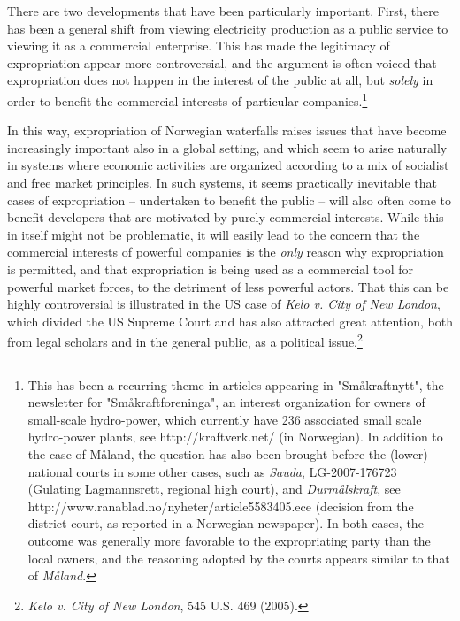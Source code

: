 There are two developments that have been particularly important. First, there has been a general shift from viewing electricity production as a public service to viewing it as a commercial enterprise. This has made the legitimacy of expropriation appear more controversial, and the argument is often voiced that expropriation does not happen in the interest of the public at all, but \emph{solely} in order to benefit the commercial interests of particular companies.\footnote{This has been a recurring theme in articles appearing in "Småkraftnytt", the newsletter for "Småkraftforeninga", an interest organization for owners of small-scale hydro-power, which currently have 236 associated small scale hydro-power plants, see http://kraftverk.net/ (in Norwegian). In addition to the case of Måland, the question has also been brought before the (lower) national courts in some other cases, such as \emph{Sauda}, LG-2007-176723 (Gulating Lagmannsrett, regional high court), and \emph{Durmålskraft}, see http://www.ranablad.no/nyheter/article5583405.ece (decision from the district court, as reported in a Norwegian newspaper). In both cases, the outcome was generally more favorable to the expropriating party than the local owners, and the reasoning adopted by the courts appears similar to that of \emph{Måland}.}

In this way, expropriation of Norwegian waterfalls raises issues that have become increasingly important also in a global setting, and which seem to arise naturally in systems where economic activities are organized according to a mix of socialist and free market principles. In such systems, it seems practically inevitable that cases of expropriation -- undertaken to benefit the public -- will also often come to benefit developers that are motivated by purely commercial interests. While this in itself might not be problematic, it will easily lead to the concern that the commercial interests of powerful companies is the \emph{only} reason why expropriation is permitted, and that expropriation is being used as a commercial tool for powerful market forces, to the detriment of less powerful actors. That this can be highly controversial is illustrated in the US case of \emph{Kelo v. City of New London}, which divided the US Supreme Court and has also attracted great attention, both from legal scholars and in the general public, as a political issue.\footnote{\emph{Kelo v. City of New London}, 545 U.S. 469 (2005).}

